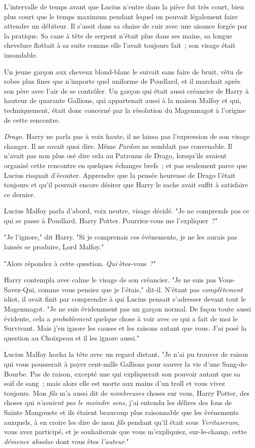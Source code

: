 L'intervalle de temps avant que Lucius n'entre dans la pièce fut très court, bien plus court que le temps maximum pendant lequel on pouvait légalement faire attendre un débiteur. Il s'assit dans sa chaise de cuir avec une aisance forgée par la pratique. Sa cane à tête de serpent n'était plus dans ses mains, sa longue chevelure flottait à sa suite comme elle l'avait toujours fait~; son visage était insondable.

Un jeune garçon aux cheveux blond-blanc le suivait sans faire de bruit, vêtu de robes plus fines que n'importe quel uniforme de Poudlard, et il marchait après son père avec l'air de se contrôler. Un garçon qui était aussi créancier de Harry à hauteur de quarante Gallions, qui appartenait aussi à la maison Malfoy et qui, techniquement, était donc concerné par la résolution du Magenmagot à l'origine de cette rencontre.

\emph{Drago.} Harry ne parla pas à voix haute, il ne laissa pas l'expression de son visage changer. Il ne savait quoi dire. Même \emph{Pardon} ne semblait pas convenable. Il n'avait pas non plus osé dire cela au Patronus de Drago, lorsqu'ils avaient organisé cette rencontre en quelques échanges brefs~; et pas seulement parce que Lucius risquait d'écouter. Apprendre que la pensée heureuse de Drago l'était toujours et qu'il pouvait encore désirer que Harry le sache avait suffit à satisfaire ce dernier.

Lucius Malfoy parla d'abord, voix neutre, visage décidé. "Je ne comprends pas ce qui se passe à Poudlard, Harry Potter. Pourriez-vous me l'expliquer~?"

"Je l'ignore," dit Harry. "Si je comprenais ces événements, je ne les aurais pas laissés se produire, Lord Malfoy."

"Alors répondez à cette question. \emph{Qui} êtes-vous~?"

Harry contempla avec calme le visage de son créancier. "Je ne suis pas Vous-Savez-Qui, comme vous pensiez que je l'étais," dit-il. N'étant pas \emph{complètement} idiot, il avait finit par comprendre à qui Lucius pensait s'adresser devant tout le Magenmagot. "Je ne suis évidemment pas un garçon normal. De façon toute aussi évidente, cela a \emph{probablement} quelque chose à voir avec ce qui a fait de moi le Survivant. Mais j'en ignore les causes et les raisons autant que vous. J'ai posé la question au Choixpeau et il les ignore aussi."

Lucius Malfoy hocha la tête avec un regard distant. "Je n'ai pu trouver de raison qui vous pousserait à payer cent-mille Gallions pour sauver la vie d'une Sang-de-Bourbe. Pas de raison, excepté une qui expliquerait son pouvoir autant que sa soif de sang~; mais alors elle est morte aux mains d'un troll et vous vivez toujours. Mon \emph{fils} m'a aussi dit de \emph{nombreuses} choses sur vous, Harry Potter, des choses qui \emph{n'avaient pas le moindre sens}, j'ai entendu les délires des fous de Sainte Mangouste et ils étaient beaucoup plus raisonnable que les événements auxquels, à en croire les dire de mon \emph{fils} pendant qu'il était sous \emph{Veritaserum}, vous avez participé, et je souhaiterais que vous m'expliquiez, sur-le-champ, cette \emph{démence absolue} dont vous êtes \emph{l'auteur}."

